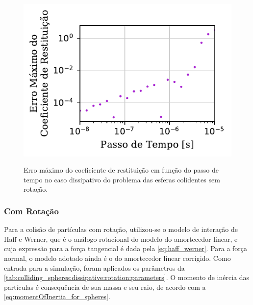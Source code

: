\begin{figure}[htb!]
	\caption{Erro máximo do coeficiente de restituição em função do passo de tempo no caso dissipativo do problema das esferas colidentes sem rotação.}
	\centering
	\includegraphics[scale=1]{images/colliding_spheres/dissipative/coefficient_of_restitution_error_loglog_small.pdf}
	\label{fig:colliding_spheres:dissipative:coefficient_of_restitution_error}
	\sourceMe
\end{figure}

\subsubsection{Com Rotação}

Para a colisão de partículas com rotação, utilizou-se o modelo de interação de Haff e Werner, que é o análogo rotacional do modelo do amortecedor linear, e cuja expressão para a força tangencial é dada pela \cref{eq:haff_werner}. Para a força normal, o modelo adotado ainda é o do amortecedor linear corrigido. Como entrada para a simulação, foram aplicados os parâmetros da \cref{tab:colliding_spheres:dissipative:rotation:parameters}. O momento de inércia das partículas é consequência de sua massa e seu raio, de acordo com a \cref{eq:momentOfInertia_for_spheres}.

